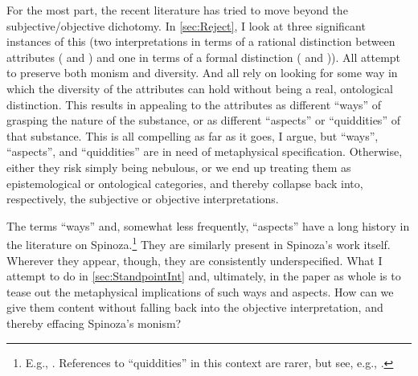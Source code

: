 \documentclass[11pt]{article}
\newcommand{\dash}{\unskip{---}}
\begin{document}
	For the most part, the recent literature has tried to move beyond the subjective/objective dichotomy. In \autoref{sec:Reject}, I look at three significant instances of this (two interpretations in terms of a rational distinction between attributes (\cite{Shein2009} and \cite{Melamed2017}) and one in terms of a formal distinction (\cite{DeleuzeExpressionism} and \cite{schmidtFormalDistinction})). All attempt to preserve both monism and diversity. And all rely on looking for some way in which the diversity of the attributes can hold without being a real, ontological distinction. This results in appealing to the attributes as different \enquote{ways} of grasping the nature of the substance, or as different \enquote{aspects} or \enquote{quiddities} of that substance. This is all compelling as far as it goes, I argue, but \enquote{ways}, \enquote{aspects}, and \enquote{quiddities} are in need of metaphysical specification. Otherwise, either they risk simply being nebulous, or we end up treating them as epistemological or ontological categories, and thereby collapse back into, respectively, the subjective or objective interpretations.
	
	The terms \enquote{ways} and, somewhat less frequently, \enquote{aspects} have a long history in the literature on Spinoza.\footnote{E.g., \textcites{Haserot1953,DeleuzeExpressionism,Jonas1986,Deveaux2003,Shein2009,Melamed2017}. References to \enquote{quiddities} in this context are rarer, but see, e.g., \textcites{DeleuzeExpressionism,schmidtFormalDistinction,Husted1987}.} They are similarly present in Spinoza’s work itself. Wherever they appear, though, they are consistently underspecified. What I attempt to do in  \autoref{sec:StandpointInt} \dash and, ultimately, in the paper as whole \dash is to tease out the metaphysical implications of such ways and aspects. How can we give them content without falling back into the objective interpretation, and thereby effacing Spinoza’s monism?
	
\end{document}
